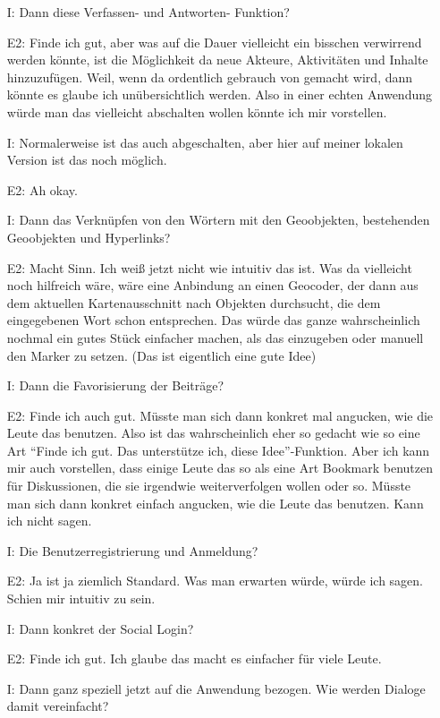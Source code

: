 \begin{itemize}
    \item[I:] Dann diese Verfassen- und Antworten- Funktion?
    \item[E2:] Finde ich gut, aber was auf die Dauer vielleicht ein bisschen verwirrend werden k{\"o}nnte, ist die M{\"o}glichkeit da neue Akteure, Aktivit{\"a}ten und Inhalte hinzuzuf{\"u}gen. Weil, wenn da ordentlich gebrauch von gemacht wird, dann k{\"o}nnte es glaube ich un{\"u}bersichtlich werden. Also in einer echten Anwendung w{\"u}rde man das vielleicht abschalten wollen k{\"o}nnte ich mir vorstellen.
    \item[I:] Normalerweise ist das auch abgeschalten, aber hier auf meiner lokalen Version ist das noch m{\"o}glich.
    \item[E2:] Ah okay.
    \item[I:] Dann das Verkn{\"u}pfen von den W{\"o}rtern mit den Geoobjekten, bestehenden Geoobjekten und Hyperlinks?
    \item[E2:] Macht Sinn. Ich wei{\ss} jetzt nicht wie intuitiv das ist. Was da vielleicht noch hilfreich w{\"a}re, w{\"a}re eine Anbindung an einen Geocoder, der dann aus dem aktuellen Kartenausschnitt nach Objekten durchsucht, die dem eingegebenen Wort schon entsprechen. Das w{\"u}rde das ganze wahrscheinlich nochmal ein gutes St{\"u}ck einfacher machen, als das einzugeben oder manuell den Marker zu setzen. (Das ist eigentlich eine gute Idee)
    \item[I:] Dann die Favorisierung der Beitr{\"a}ge?
    \item[E2:] Finde ich auch gut. M{\"u}sste man sich dann konkret mal angucken, wie die Leute das benutzen. Also ist das wahrscheinlich eher so gedacht wie so eine Art "`Finde ich gut. Das unterst{\"u}tze ich, diese Idee"'-Funktion. Aber ich kann mir auch vorstellen, dass einige Leute das so als eine Art Bookmark benutzen f{\"u}r Diskussionen, die sie irgendwie weiterverfolgen wollen oder so. M{\"u}sste man sich dann konkret einfach angucken, wie die Leute das benutzen. Kann ich nicht sagen.
    \item[I:] Die Benutzerregistrierung und Anmeldung?
    \item[E2:] Ja ist ja ziemlich Standard. Was man erwarten w{\"u}rde, w{\"u}rde ich sagen. Schien mir intuitiv zu sein.
    \item[I:] Dann konkret der Social Login?
    \item[E2:] Finde ich gut. Ich glaube das macht es einfacher f{\"u}r viele Leute.
    \item[I:] Dann ganz speziell jetzt auf die Anwendung bezogen. Wie werden Dialoge damit vereinfacht?

\end{itemize}
